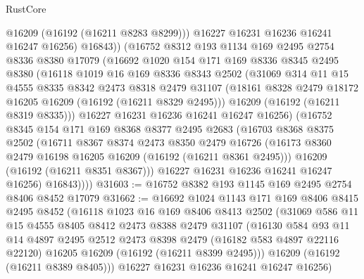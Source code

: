 \begin{lexlean}{RustCore}
\begin{coremodule}
              @16209
              (@16192 (@16211 @8283 @8299)))
            @16227
            @16231
            @16236
            @16241
            @16247
            @16256)
          @16843))
      (@16752
        @8312
        @193
        @1134
        @169
        @2495
        @2754
        @8336
        @8380
        @17079
        (@16692
          @1020
          @154
          @171
          @169
          @8336
          @8345
          @2495
          @8380
          (@16118
            @1019
            @16
            @169
            @8336
            @8343
            @2502
            (@31069
              @314
              @11
              @15
              @4555
              @8335
              @8342
              @2473
              @8318
              @2479
              @31107
              (@18161 @8328 @2479 @18172 @16205 @16209 (@16192 (@16211 @8329 @2495)))
              @16209
              (@16192 (@16211 @8319 @8335)))
            @16227
            @16231
            @16236
            @16241
            @16247
            @16256)
          (@16752
            @8345
            @154
            @171
            @169
            @8368
            @8377
            @2495
            @2683
            (@16703
              @8368
              @8375
              @2502
              (@16711
                @8367
                @8374
                @2473
                @8350
                @2479
                @16726
                (@16173 @8360 @2479 @16198 @16205 @16209 (@16192 (@16211 @8361 @2495)))
                @16209
                (@16192 (@16211 @8351 @8367)))
              @16227
              @16231
              @16236
              @16241
              @16247
              @16256)
            @16843))))
@31603 := @16752 @8382 @193 @1145 @169 @2495 @2754 @8406 @8452 @17079
@31662 := @16692
    @1024
    @1143
    @171
    @169
    @8406
    @8415
    @2495
    @8452
    (@16118
      @1023
      @16
      @169
      @8406
      @8413
      @2502
      (@31069
        @586
        @11
        @15
        @4555
        @8405
        @8412
        @2473
        @8388
        @2479
        @31107
        (@16130
          @584
          @93
          @11
          @14
          @4897
          @2495
          @2512
          @2473
          @8398
          @2479
          (@16182 @583 @4897 @22116 @22120)
          @16205
          @16209
          (@16192 (@16211 @8399 @2495)))
        @16209
        (@16192 (@16211 @8389 @8405)))
      @16227
      @16231
      @16236
      @16241
      @16247
      @16256)

\end{coremodule}
\end{lexlean}
